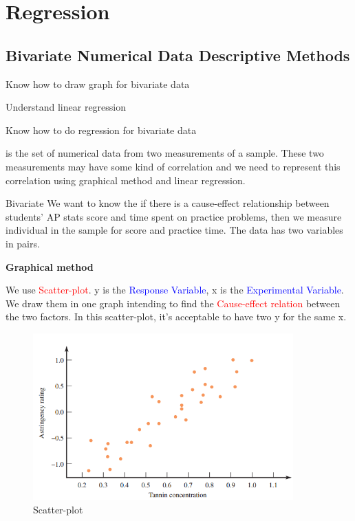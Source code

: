 \section{Regression}

\subsection{Bivariate Numerical Data Descriptive Methods}
\begin{objectives}
    \item Know how to draw graph for bivariate data
    \item Understand linear regression
    \item Know how to do regression for bivariate data
\end{objectives}
\vbox{}
 is the set of numerical data from two measurements of a sample. These two measurements may have some kind of correlation and we need to represent this correlation using graphical method and linear regression.\\
\begin{examplebox}{Bivariate}
    We want to know the if there is a cause-effect relationship between students' AP stats score and time spent on practice problems, then we measure individual in the sample for score and practice time. The data has two variables in pairs.
\end{examplebox}
\begin{Center}
    \textbf{Graphical method}
\end{Center}
We use \textcolor{red}{Scatter-plot}. y is the \textcolor{blue}{Response Variable}, x is the \textcolor{blue}{Experimental Variable}. We draw them in one graph intending to find the \textcolor{red}{Cause-effect relation} between the two factors. In this scatter-plot, it's acceptable to have two y for the same x.
\begin{figure}[H]
    \centering
        \includegraphics[width=100mm]{relation.png}
        \caption{Scatter-plot}
        \label{fig:my_label}
\end{figure}
